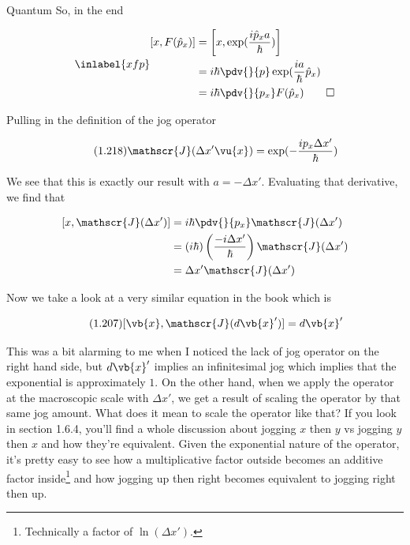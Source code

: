 \begin{answer}
\begin{answerpart}{Quantum}
    So, in the end

    \begin{equation}
      \inlabel{xfp}
      \begin{split}
        [x, F(\hat{p}_x)]
        &= \left[x, \exp(\frac{i\hat{p}_xa}{\hbar})\right]\\
        &= 
        i\hbar
        \pdv{}{p}
        \exp(\frac{ia}{\hbar}\hat{p}_x)
        \\
        &=
        i\hbar
        \pdv{}{p_x}
        F(\hat{p}_x)\qed
        \\
      \end{split}
    \end{equation}

    Pulling in the definition of the jog operator

    \begin{equation}
      \tag{1.218}
      \mathscr{J}(\Delta x' \vu{x}) = \exp(- \frac{ip_x\Delta x'}{\hbar})
    \end{equation}

    We see that this is exactly our result with $a=-\Delta x'$.
    Evaluating that derivative, we find that

    \begin{equation}
      \begin{split}
        [x, \mathscr{J}(\Delta x')]
        &=
        i\hbar
        \pdv{}{p_x}
        \mathscr{J}(\Delta x')
        \\
        &=
        \left( i\hbar \right)
        \left( \frac{-i\Delta x'}{\hbar} \right)
        \mathscr{J}(\Delta x')
        \\
        &=
        \Delta x'
        \mathscr{J}(\Delta x')
        \\
      \end{split}
    \end{equation}

    Now we take a look at a very similar equation in the book which is

    \begin{equation}
      \tag{1.207}
      [\vb{x}, \mathscr{J}(d\vb{x}')] = d\vb{x}'
    \end{equation}

    This was a bit alarming to me when I noticed the lack of jog
    operator on the right hand side, but $d\vb{x}'$ implies an
    infinitesimal jog which implies that the exponential is
    approximately $1$.  On the other hand, when we apply the operator
    at the macroscopic scale with $\Delta x'$, we get a result of
    scaling the operator by that same jog amount.  What does it mean
    to scale the operator like that?  If you look in section 1.6.4,
    you'll find a whole discussion about jogging $x$ then $y$ vs
    jogging $y$ then $x$ and how they're equivalent.  Given the
    exponential nature of the operator, it's pretty easy to see how a
    multiplicative factor outside becomes an additive factor
    inside\footnote{Technically a factor of $\ln(\Delta x').$} and how
    jogging up then right becomes equivalent to jogging right then up.


\end{answerpart}
\end{answer}
